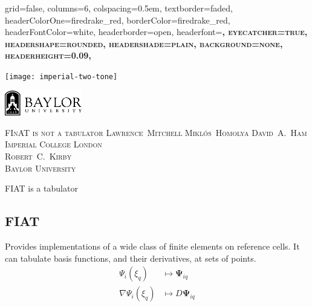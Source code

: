 \documentclass[a0paper,portrait]{baposter}
\begin{document}
\begin{poster}{
    grid=false,
    columns=6,
    colspacing=0.5em,
    textborder=faded,
    headerColorOne=firedrake_red,
    borderColor=firedrake_red,
    headerFontColor=white,
    headerborder=open,
    headerfont=\bfseries\Large\scshape,
    eyecatcher=true,
    headershape=rounded,
    headershade=plain,
    background=none,
    headerheight=0.09\textheight,
  }
  {
    \begin{minipage}[l]{0.3\textwidth}
      \texttt{[image: imperial-two-tone]}
      \par
      \vspace{0.2cm}
      \includegraphics[align=t, height=1.1cm]{baylor-logo-bw}
    \end{minipage}
  } 
  {\scshape\LARGE FInAT is not a tabulator}
  {\vspace{0.2em}\small\scshape Lawrence~Mitchell\quad
    Mikl\'os~Homolya \quad David~A.~Ham\\[0.15em]Imperial College London
    \\[0.5em]  
    Robert~C.~Kirby\\[0.15em]Baylor University}
  {
  }

  \begin{posterbox}[name=introduction,span=6,column=0,row=0]{FIAT is a
      tabulator}
    \begin{minipage}[t]{0.49\textwidth}%
      \subsection*{FIAT}
      \vspace{-0.25\baselineskip}
      \raggedright
      Provides implementations of a wide class of finite elements on
      reference cells. It can tabulate basis functions, and their
      derivatives, at sets of points.  \vspace{-1\baselineskip}
      \begin{align*}
        \Psi_i(\xi_q) &\mapsto \mathbf{\Psi}_{iq}\\
        \nabla\Psi_i(\xi_q) &\mapsto D\mathbf{\Psi}_{iq}
      \end{align*}
    \end{minipage}%
    \hspace{0.02\textwidth}%
    \begin{minipage}[t]{0.49\textwidth}%
      \raggedright

\end{minipage}
\end{posterbox}
\end{poster}
\end{document}
